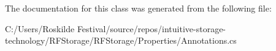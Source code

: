 The documentation for this class was generated from the following file\+:\begin{DoxyCompactItemize}
\item 
C\+:/\+Users/\+Roskilde Festival/source/repos/intuitive-\/storage-\/technology/\+R\+F\+Storage/\+R\+F\+Storage/\+Properties/Annotations.\+cs\end{DoxyCompactItemize}

